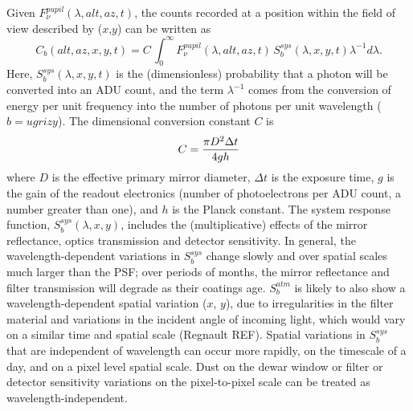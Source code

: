 \documentclass[12pt,preprint]{aastex}
\begin{document}
Given $F_\nu^{pupil}(\lambda,alt,az,t)$, the counts recorded at a
position within the field of view described by ($x$,$y$) can be
written as
\begin{equation}
\label{eqn:Fpupil2counts}
    C_b(alt,az,x,y,t) = C \, \int_0^\infty {F_\nu^{pupil}(\lambda,alt,az,t) \, S_b^{sys}(\lambda,x,y,t) \lambda^{-1}d\lambda}.
\end{equation}
Here, $S_b^{sys}(\lambda,x,y,t)$ is the (dimensionless) probability
that a photon will be converted into an ADU count, and the term
$\lambda^{-1}$ comes from the conversion of energy per unit frequency
into the number of photons per unit wavelength ($b=ugrizy$). The
dimensional conversion constant $C$ is
\begin{equation}
\label{eqn:Cconstant}
        C = {\pi D^2 \Delta t \over 4 g h }  
\end{equation}
where $D$ is the effective primary mirror diameter, $\Delta t$ is the
exposure time, $g$ is the gain of the readout electronics (number of
photoelectrons per ADU count, a number greater than one), and $h$ is
the Planck constant. The system response function,
$S_b^{sys}(\lambda,x,y)$, includes the (multiplicative) effects of the
mirror reflectance, optics transmission and detector sensitivity. In
general, the wavelength-dependent variations in $S_b^{sys}$ change
slowly and over spatial scales much larger than the PSF; over periods
of months, the mirror reflectance and filter transmission will degrade
as their coatings age. $S_b^{atm}$ is likely to also show a
wavelength-dependent spatial variation ($x$, $y$), due to
irregularities in the filter material and variations in the incident
angle of incoming light, which would vary on a similar time and
spatial scale (Regnault REF). Spatial variations in $S_b^{sys}$ that
are independent of wavelength can occur more rapidly, on the timescale
of a day, and on a pixel level spatial scale. Dust on the dewar window
or filter or detector sensitivity variations on the pixel-to-pixel
scale can be treated as wavelength-independent.
\end{document}
